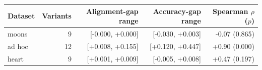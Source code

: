 \begin{tabular}{lrrrr}
\toprule
Dataset & Variants & Alignment-gap range & Accuracy-gap range & Spearman $\rho$ ($p$) \\
\midrule
moons & 9 & [-0.000, +0.000] & [-0.030, +0.003] & -0.07 (0.865) \\
ad hoc & 12 & [+0.008, +0.155] & [+0.120, +0.447] & +0.90 (0.000) \\
heart & 9 & [+0.001, +0.009] & [-0.005, +0.008] & +0.47 (0.197) \\
\bottomrule
\end{tabular}
